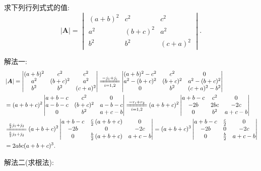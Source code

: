 \documentclass[../../main.tex]{subfiles}%
\begin{document}
\begin{example}
求下列行列式式的值:
\[
\left| \boldsymbol{A} \right|=\begin{vmatrix}
(a + b)^2 & c^2 & c^2 \\
a^2 & (b + c)^2 & a^2 \\
b^2 & b^2 & (c + a)^2
\end{vmatrix}.
\]
\end{example}
\begin{solution}

{\color{blue}解法一:}
\begin{align*}
&\left| \boldsymbol{A} \right|=\left| \begin{matrix}
(a+b)^2&		c^2&		c^2\\
a^2&		(b+c)^2&		a^2\\
b^2&		b^2&		(c+a)^2\\
\end{matrix} \right|\xlongequal[i=1,2]{-j_1+j_i}\left| \begin{matrix}
(a+b)^2-c^2&		c^2&		0\\
a^2-(b+c)^2&		(b+c)^2&		a^2-(b+c)^2\\
0&		b^2&		(c+a)^2-b^2\\
\end{matrix} \right|
\\
&=(a+b+c)^2\left| \begin{matrix}
a+b-c&		c^2&		0\\
a-b-c&		(b+c)^2&		a-b-c\\
0&		b^2&		a+c-b\\
\end{matrix} \right|\xlongequal[i=1,2]{-r_i+r_2}(a+b+c)^2\left| \begin{matrix}
a+b-c&		c^2&		0\\
-2b&		2bc&		-2c\\
0&		b^2&		a+c-b\\
\end{matrix} \right|
\\
&\xlongequal[\frac{b}{2}j_3+j_2]{\frac{c}{2}j_1+j_2}(a+b+c)^2\left| \begin{matrix}
a+b-c&		\frac{c}{2}\left( a+b+c \right)&		0\\
-2b&		0&		-2c\\
0&		\frac{b}{2}\left( a+b+c \right)&		a+c-b\\
\end{matrix} \right|=(a+b+c)^3\left| \begin{matrix}
a+b-c&		\frac{c}{2}&		0\\
-2b&		0&		-2c\\
0&		\frac{b}{2}&		a+c-b\\
\end{matrix} \right|
\\
&=2abc(a+b+c)^3.
\end{align*}

{\color{blue}解法二(求根法):}

\end{solution}
\end{document}
